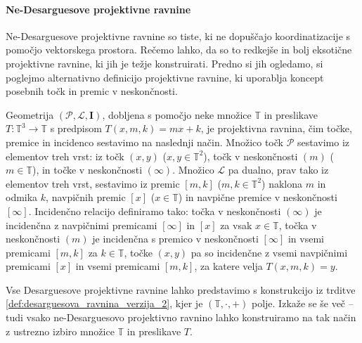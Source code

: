 \documentclass[fin1, tisk]{fmfdelo}
\newcommand{\R}{\mathbb{T}}
\newcommand{\II}{\mathbf{I}}
\newcommand{\PP}{\mathcal{P}}
\newcommand{\LL}{\mathcal{L}}
\begin{document}
\paragraph{Ne-Desarguesove projektivne ravnine}

Ne-Desarguesove projektivne ravnine so tiste, ki ne dopuščajo koordinatizacije s pomočjo vektorskega prostora.
Rečemo lahko, da so to redkejše in bolj eksotične projektivne ravnine, ki jih je težje konstruirati.
Predno si jih ogledamo, si poglejmo alternativno definicijo projektivne ravnine, ki uporablja koncept
posebnih točk in premic v neskončnosti.


\begin{trditev}\label{def:desarguesova_ravnina_verzija_2}
Geometrija $(\PP, \LL,\II)$, dobljena s pomočjo neke množice $\R$ in
preslikave $T: \R^3 \to \R$ s predpisom $T(x,m,k)=mx+k$, je projektivna ravnina, čim točke, premice in incidenco sestavimo na naslednji način.  
Množico točk $\PP$ sestavimo iz elementov treh vrst: iz
točk $(x, y)$ ($x, y\in \R^2$), točk v neskončnosti $(m)$ ($m\in \R$), in točke v neskončnosti $(\infty)$.
Množico $\LL$ pa dualno, prav tako iz elementov treh vrst, sestavimo iz
premic $[m, k]$ ($m, k\in\R^2$) naklona $m$ in odmika $k$, navpičnih premic $[x]$ ($x \in \R$) in navpične premice v neskončnosti $[\infty]$.
Incidenčno relacijo definiramo tako: točka v neskončnosti $(\infty)$ je incidenčna z 
navpičnimi premicami $[\infty]$ in $[x]$ za vsak $x\in\R$, točka v neskončnosti $(m)$ je incidenčna s premico
v neskončnosti $[\infty]$ in 
vsemi premicami $[m, k]$ za $k\in\R$, točke $(x, y)$ pa so incidenčne z vsemi navpičnimi premicami $[x]$ 
in vsemi premicami $[m, k]$, za katere velja $T(x, m, k) = y$.
\end{trditev}


\begin{opomba}
    Vse Desarguesove projektivne ravnine lahko predstavimo s konstrukcijo iz trditve \ref{def:desarguesova_ravnina_verzija_2}, 
    kjer je $(\R, \cdot, +)$ polje. Izkaže se še več -- tudi vsako ne-Desarguesovo projektivno ravnino lahko konstruiramo na
    tak način z ustrezno izbiro množice $\R$ in preslikave $T$.
\end{opomba}
\end{document}
